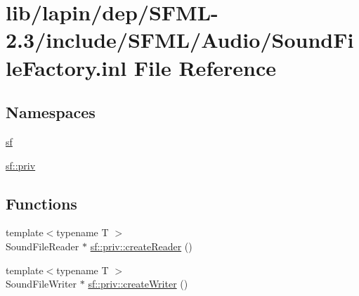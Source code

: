 \hypertarget{lapin_2dep_2_s_f_m_l-2_83_2include_2_s_f_m_l_2_audio_2_sound_file_factory_8inl}{\section{lib/lapin/dep/\-S\-F\-M\-L-\/2.3/include/\-S\-F\-M\-L/\-Audio/\-Sound\-File\-Factory.inl File Reference}
\label{lapin_2dep_2_s_f_m_l-2_83_2include_2_s_f_m_l_2_audio_2_sound_file_factory_8inl}
}
\subsection*{Namespaces}
\begin{DoxyCompactItemize}
\item 
\hyperlink{namespacesf}{sf}
\item 
\hyperlink{namespacesf_1_1priv}{sf\-::priv}
\end{DoxyCompactItemize}
\subsection*{Functions}
\begin{DoxyCompactItemize}
\item 
{\footnotesize template$<$typename T $>$ }\\Sound\-File\-Reader $\ast$ \hyperlink{namespacesf_1_1priv_aca30ad5e6ee22353d72145af1af53b78}{sf\-::priv\-::create\-Reader} ()
\item 
{\footnotesize template$<$typename T $>$ }\\Sound\-File\-Writer $\ast$ \hyperlink{namespacesf_1_1priv_aaa8b548de29fc4570064f372b4df8df0}{sf\-::priv\-::create\-Writer} ()
\end{DoxyCompactItemize}
